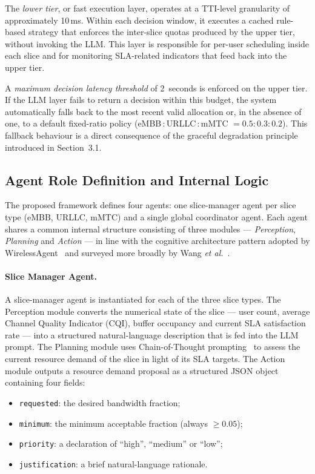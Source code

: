 The \emph{lower tier}, or fast execution layer, operates at a TTI-level granularity of approximately 10\,ms. Within each decision window, it executes a cached rule-based strategy that enforces the inter-slice quotas produced by the upper tier, without invoking the LLM. This layer is responsible for per-user scheduling inside each slice and for monitoring SLA-related indicators that feed back into the upper tier.

A \emph{maximum decision latency threshold} of 2~seconds is enforced on the upper tier. If the LLM layer fails to return a decision within this budget, the system automatically falls back to the most recent valid allocation or, in the absence of one, to a default fixed-ratio policy (eMBB\,:\,URLLC\,:\,mMTC $= 0.5 : 0.3 : 0.2$). This fallback behaviour is a direct consequence of the graceful degradation principle introduced in Section~3.1.

\subsection{Agent Role Definition and Internal Logic}

The proposed framework defines four agents: one slice-manager agent per slice type (eMBB, URLLC, mMTC) and a single global coordinator agent. Each agent shares a common internal structure consisting of three modules --- \emph{Perception}, \emph{Planning} and \emph{Action} --- in line with the cognitive architecture pattern adopted by WirelessAgent~\cite{tong2025wirelessagent} and surveyed more broadly by Wang \emph{et al.}~\cite{wang2023agentsurvey}.

\paragraph{Slice Manager Agent.} A slice-manager agent is instantiated for each of the three slice types. The Perception module converts the numerical state of the slice --- user count, average Channel Quality Indicator (CQI), buffer occupancy and current SLA satisfaction rate --- into a structured natural-language description that is fed into the LLM prompt. The Planning module uses Chain-of-Thought prompting~\cite{wei2022cot} to assess the current resource demand of the slice in light of its SLA targets. The Action module outputs a resource demand proposal as a structured JSON object containing four fields:

\begin{itemize}
    \item \texttt{requested}: the desired bandwidth fraction;
    \item \texttt{minimum}: the minimum acceptable fraction (always $\geq 0.05$);
    \item \texttt{priority}: a declaration of ``high'', ``medium'' or ``low'';
    \item \texttt{justification}: a brief natural-language rationale.
\end{itemize}

